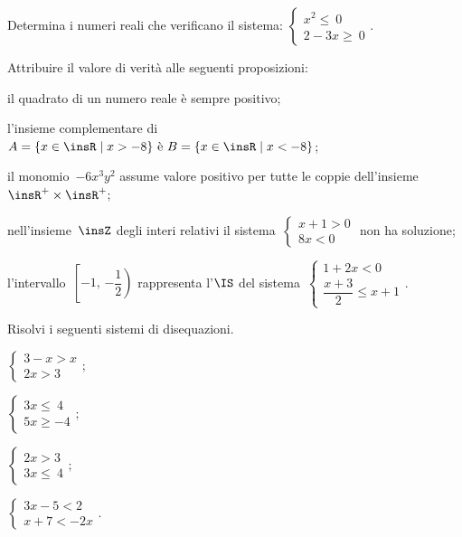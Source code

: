 \begin{esercizio}[\Ast]
 \label{ese:20.36}
 Determina i numeri reali che verificano il sistema:
 $\left\{%
  \begin{array}{l}
  x^{2}\le~0
  \\2-3x\ge~0
 \end{array}\right..$
 \end{esercizio}

\begin{esercizio}
 \label{ese:20.37}
 Attribuire il valore di verità alle seguenti proposizioni:

\begin{enumeratea}
\item il quadrato di un numero reale è sempre positivo;
\item l'insieme complementare di~$A=\{x\in\insR\;|\;x>-8\}\text{ è }B=\{x\in\insR \mid x<-8\}$;
\item il monomio~$-6x^{3}y^{2}$ assume valore positivo per tutte le coppie dell'insieme~$\insR^{+}\times\insR^{+}$;
\item nell'insieme~$\insZ$ degli interi relativi il sistema~$\left\{\begin{array}{l}x+1>0\\8x<0\end{array}\right.$ non ha soluzione;
\item l'intervallo~$\left[-1\text{,~}\left.-{\dfrac{1}{2}}\right)\right.$ rappresenta l'$\IS$ del sistema~$\left\{\begin{array}{l}1+2x<0 \\\dfrac{x+3}{2}\le x+1\end{array}\right.$.
\end{enumeratea}
\end{esercizio}

\begin{esercizio}[\Ast]
 \label{ese:20.38}
 Risolvi i seguenti sistemi di disequazioni.
 \begin{multicols}{2}
 \begin{enumeratea}
 \item $\left\{\begin{array}{l}
	3-x>x\\
	2x>3
	\end{array}\right.;$
\item $\left\{\begin{array}{l}
	3x\le~4\\
	5x\ge -4
   \end{array}\right.;$
\item $\left\{\begin{array}{l}
	2x>3\\
	3x\le~4
	\end{array}\right.;$
\item $\left\{\begin{array}{l}
	3x-5<2\\
	x+7<-2x
   \end{array}\right..$
 \end{enumeratea}
\end{multicols}
\end{esercizio}

